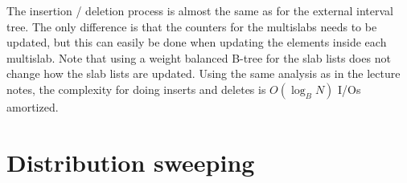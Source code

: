 \documentclass[a4paper,12pt]{article}
\begin{document}
The insertion / deletion process is almost the same as for the external interval tree. The only difference is that the counters for the multislabs needs to be updated, but this can easily be done when updating the elements inside each multislab. Note that using a weight balanced B-tree for the slab lists does not change how the slab lists are updated. Using the same analysis as in the lecture notes, the complexity for doing inserts and deletes is $O(\log_B N)$ I/Os amortized.

\pagebreak
\section{Distribution sweeping}



%
\end{document}
